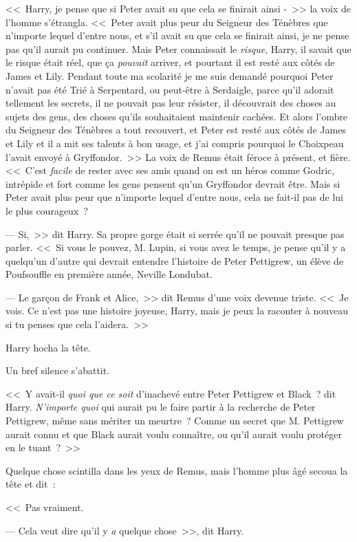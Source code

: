 <<~Harry, je pense que si Peter avait su que cela se finirait ainsi -~>> la voix de l'homme s'étrangla. <<~Peter avait plus peur du Seigneur des Ténèbres que n'importe lequel d'entre nous, et s'il avait su que cela se finirait ainsi, je ne pense pas qu'il aurait pu continuer. Mais Peter connaissait le \emph{risque}, Harry, il savait que le risque était réel, que ça \emph{pouvait} arriver, et pourtant il est resté aux côtés de James et Lily. Pendant toute ma scolarité je me suis demandé pourquoi Peter n'avait pas été Trié à Serpentard, ou peut-être à Serdaigle, parce qu'il adorait tellement les secrets, il ne pouvait pas leur résister, il découvrait des choses au sujets des gens, des choses qu'ils souhaitaient maintenir cachées. Et alors l'ombre du Seigneur des Ténèbres a tout recouvert, et Peter est resté aux côtés de James et Lily et il a mit ses talents à bon usage, et j'ai compris pourquoi le Choixpeau l'avait envoyé à Gryffondor.~>> La voix de Remus était féroce à présent, et fière. <<~C'est \emph{facile} de rester avec ses amis quand on est un héros comme Godric, intrépide et fort comme les gens pensent qu'un Gryffondor devrait être. Mais si Peter avait plus peur que n'importe lequel d'entre nous, cela ne fait-il pas de lui le plus courageux~?

--- Si,~>> dit Harry. Sa propre gorge était si serrée qu'il ne pouvait presque pas parler. <<~Si vous le pouvez, M. Lupin, si vous avez le temps, je pense qu'il y a quelqu'un d'autre qui devrait entendre l'histoire de Peter Pettigrew, un élève de Poufsouffle en première année, Neville Londubat.

--- Le garçon de Frank et Alice,~>> dit Remus d'une voix devenue triste. <<~Je vois. Ce n'est pas une histoire joyeuse, Harry, mais je peux la raconter à nouveau si tu penses que cela l'aidera.~>>

Harry hocha la tête.

Un bref silence s'abattit.

<<~Y avait-il \emph{quoi que ce soit} d'inachevé entre Peter Pettigrew et Black~? dit Harry. \emph{N'importe quoi} qui aurait pu le faire partir à la recherche de Peter Pettigrew, même sans mériter un meurtre~? Comme un secret que M. Pettigrew aurait connu et que Black aurait voulu connaître, ou qu'il aurait voulu protéger en le tuant~?~>>

Quelque chose scintilla dans les yeux de Remus, mais l'homme plus âgé secoua la tête et dit~:

<<~Pas vraiment.

--- Cela veut dire qu'il y \emph{a} quelque chose~>>, dit Harry.


